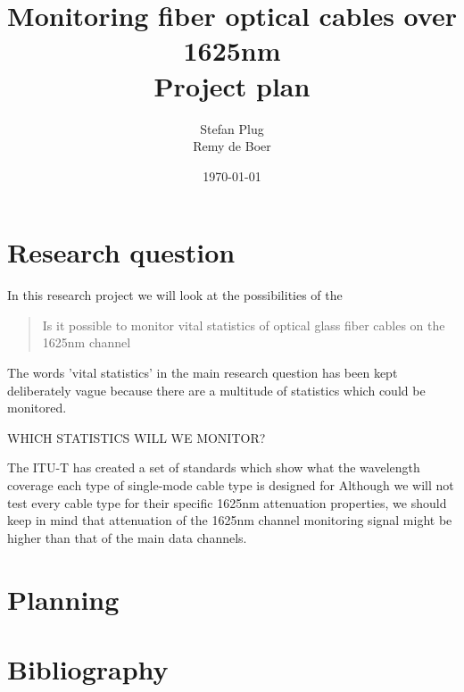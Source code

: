 \documentclass{article}
\begin{document}
\title{Monitoring fiber optical cables over 1625nm\\Project plan}
\author{Stefan Plug\\Remy de Boer}
\date{\today}
\maketitle

\section{Research question}
In this research project we will look at the possibilities of the 
\begin{quote}
Is it possible to monitor vital statistics of optical glass fiber cables on the 1625nm channel
\end{quote}

The words 'vital statistics' in the main research question has been kept deliberately vague because there are a multitude of statistics which could be monitored. 

WHICH STATISTICS WILL WE MONITOR?

The ITU-T has created a set of standards which show what the wavelength coverage each type of single-mode cable type is designed for \cite[p.~21]{refguide:2011} Although we will not test every cable type for their specific 1625nm attenuation properties, we should keep in mind that attenuation of the 1625nm channel monitoring signal might be higher than that of the main data channels.





\section{Planning}

\section{Bibliography}


\end{document}
